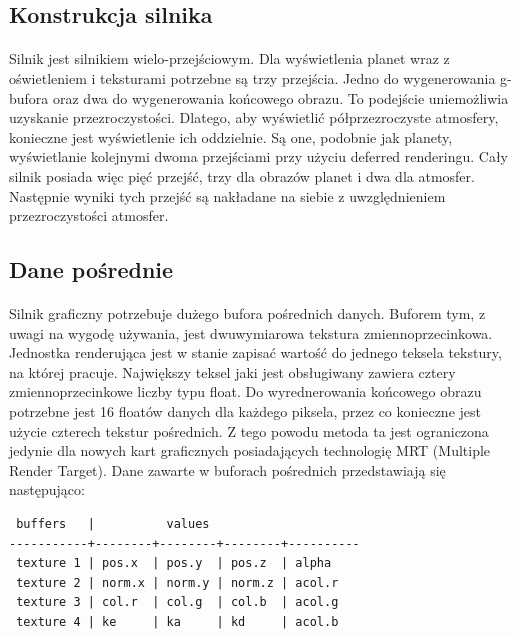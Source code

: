 
\subsection{Konstrukcja silnika}\label{sub:konstrukcja silnika}
\paragraph{}

Silnik jest silnikiem wielo-przejściowym. Dla wyświetlenia planet wraz z oświetleniem i teksturami potrzebne są trzy przejścia. Jedno do wygenerowania g-bufora oraz dwa do wygenerowania końcowego obrazu. To podejście uniemożliwia uzyskanie przezroczystości. Dlatego, aby wyświetlić półprzezroczyste atmosfery, konieczne jest wyświetlenie ich oddzielnie. Są one, podobnie jak planety, wyświetlanie kolejnymi dwoma przejściami przy użyciu deferred renderingu. Cały silnik posiada więc pięć przejść, trzy dla obrazów planet i dwa dla atmosfer. Następnie wyniki tych przejść są nakładane na siebie z uwzględnieniem przezroczystości atmosfer.

\subsection{Dane pośrednie}\label{sub:dane pośrednie}
\paragraph{}

Silnik graficzny potrzebuje dużego bufora pośrednich danych. Buforem tym, z uwagi na wygodę używania, jest dwuwymiarowa tekstura zmiennoprzecinkowa. Jednostka renderująca jest w stanie zapisać wartość do jednego teksela tekstury, na której pracuje. Największy teksel jaki jest obsługiwany zawiera cztery zmiennoprzecinkowe liczby typu float. Do wyrednerowania końcowego obrazu potrzebne jest 16 floatów danych dla każdego piksela, przez co konieczne jest użycie czterech tekstur pośrednich. Z tego powodu metoda ta jest ograniczona jedynie dla nowych kart graficznych posiadających technologię MRT (Multiple Render Target). Dane zawarte w buforach pośrednich przedstawiają się następująco:

\begin{verbatim}
 buffers   |          values 
-----------+--------+--------+--------+----------
 texture 1 | pos.x  | pos.y  | pos.z  | alpha
 texture 2 | norm.x | norm.y | norm.z | acol.r
 texture 3 | col.r  | col.g  | col.b  | acol.g   
 texture 4 | ke     | ka     | kd     | acol.b
\end{verbatim}

